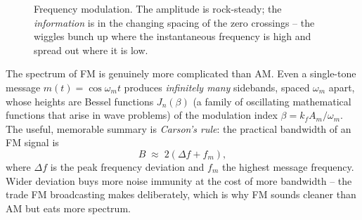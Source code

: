 \begin{figure}[H]
\centering
{}
\caption{Frequency modulation. The amplitude is rock-steady; the \emph{information} is in
the changing spacing of the zero crossings -- the wiggles bunch up where the
instantaneous frequency is high and spread out where it is low.}
\label{ch23:fig-fm}
\end{figure}

The spectrum of FM is genuinely more complicated than AM. Even a single-tone message
$m(t)=\cos\omega_m t$ produces \emph{infinitely many} sidebands, spaced $\omega_m$ apart,
whose heights are Bessel functions $J_n(\beta)$ (a family of oscillating mathematical functions that arise in wave problems) of the modulation index
$\beta = k_f A_m/\omega_m$. The useful, memorable summary is \emph{Carson's rule}: the
practical bandwidth of an FM signal is
\begin{equation}
\label{ch23:carson}
B \;\approx\; 2(\Delta f + f_m),
\end{equation}
where $\Delta f$ is the peak frequency deviation and $f_m$ the highest message frequency.
Wider deviation buys more noise immunity at the cost of more bandwidth -- the trade FM
broadcasting makes deliberately, which is why FM sounds cleaner than AM but eats more
spectrum.

